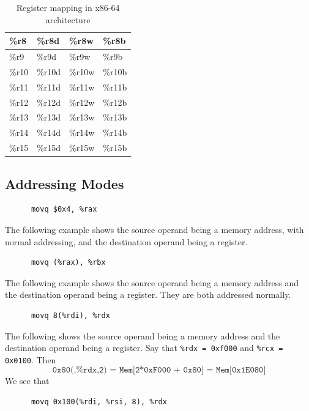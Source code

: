 \begin{definition}
\begin{table}[H]
\begin{tabular}{|l|l|l|l|}
      \%r8 & \%r8d & \%r8w & \%r8b \\ \hline
      \%r9 & \%r9d & \%r9w & \%r9b \\ \hline
      \%r10 & \%r10d & \%r10w & \%r10b \\ \hline
      \%r11 & \%r11d & \%r11w & \%r11b \\ \hline
      \%r12 & \%r12d & \%r12w & \%r12b \\ \hline
      \%r13 & \%r13d & \%r13w & \%r13b \\ \hline
      \%r14 & \%r14d & \%r14w & \%r14b \\ \hline
      \%r15 & \%r15d & \%r15w & \%r15b \\ \hline
      \end{tabular}
      \caption{Register mapping in x86-64 architecture}
      \label{table:register_mapping}
    \end{table}
  \end{definition}

\subsection{Addressing Modes}

  \begin{example}
    \begin{lstlisting} 
      movq $0x4, %rax
    \end{lstlisting}
  \end{example}

  \begin{example}
    The following example shows the source operand being a memory address, with normal addressing, and the destination operand being a register.  
    \begin{lstlisting} 
      movq (%rax), %rbx
    \end{lstlisting}
  \end{example}

  \begin{example}
    The following example shows the source operand being a memory address and the destination operand being a register. They are both addressed normally. 
    \begin{lstlisting} 
      movq 8(%rdi), %rdx
    \end{lstlisting}
  \end{example}

  \begin{example}
    The following shows the source operand being a memory address and the destination operand being a register. Say that \texttt{\%rdx = 0xf000} and \texttt{\%rcx = 0x0100}. Then 
    \begin{equation}
      \texttt{0x80(,\%rdx,2) = Mem[2*0xF000 + 0x80] = Mem[0x1E080]}
    \end{equation}
    We see that 
    \begin{lstlisting} 
      movq 0x100(%rdi, %rsi, 8), %rdx
    \end{lstlisting}
  \end{example}

